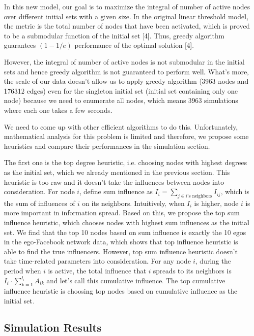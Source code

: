 \documentclass{article}
\begin{document}
In this new model, our goal is to maximize the integral of number of active nodes over different initial sets with a given size. In the original linear threshold model, the metric is the total number of nodes that have been activated, which is proved to be a submodular function of the initial set [4]. Thus, greedy algorithm guarantees $(1 - 1/e)$ performance of the optimal solution [4].

However, the integral of number of active nodes is not submodular in the initial sets and hence greedy algorithm is not guaranteed to perform well. What's more, the scale of our data doesn't allow us to apply greedy algorithm (3963 nodes and 176312 edges) even for the singleton initial set (initial set containing only one node) because we need to enumerate all nodes, which means 3963 simulations where each one takes a few seconds.

We need to come up with other efficient algorithms to do this. Unfortunately, mathematical analysis for this problem is limited and therefore, we propose some heuristics and compare their performances in the simulation section.

The first one is the top degree heuristic, i.e. choosing nodes with highest degrees as the initial set, which we already mentioned in the previous section. This heuristic is too raw and it doesn't take the influences between nodes into consideration. For node $i$, define sum influence as $I_i = \sum_{j \in i\text{'s neighbors}} I_{ij}$, which is the sum of influences of $i$ on its neighbors. Intuitively, when $I_i$ is higher, node $i$ is more important in information spread. Based on this, we propose the top sum influence heuristic, which chooses nodes with highest sum influences as the initial set. We find that the top 10 nodes based on sum influence is exactly the 10 egos in the ego-Facebook network data, which shows that top influence heuristic is able to find the true influencers. However, top sum influence heuristic doesn't take time-related parameters into consideration. For any node $i$, during the period when $i$ is active, the total influence that $i$ spreads to its neighbors is $I_i \cdot \sum_{k=1}^{l_i} A_{ik}$ and let's call this cumulative influence. The top cumulative influence heuristic is choosing top nodes based on cumulative influence as the initial set.

\subsection{Simulation Results}
\end{document}
